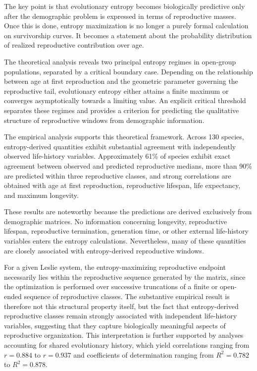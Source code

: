 \documentclass[10pt,a4paper]{amsart}
\theoremstyle{definition}
\theoremstyle{remark}
\numberwithin{equation}{section}
\begin{document}
The key point is that evolutionary entropy becomes biologically predictive only after the demographic problem is expressed in terms of reproductive masses. Once this is done, entropy maximization is no longer a purely formal calculation on survivorship curves. It becomes a statement about the probability distribution of realized reproductive contribution over age.

The theoretical analysis reveals two principal entropy regimes in
open-group populations, separated by a critical boundary case. Depending on the relationship between age at first
reproduction and the geometric parameter governing the reproductive
tail, evolutionary entropy either attains a finite maximum or
converges asymptotically towards a limiting value. An explicit
critical threshold separates these regimes and provides a criterion
for predicting the qualitative structure of reproductive windows
from demographic information.

The empirical analysis supports this theoretical framework. Across
130 species, entropy-derived quantities exhibit substantial agreement
with independently observed life-history variables. Approximately
61\% of species exhibit exact agreement between observed and predicted
reproductive medians, more than 90\% are predicted within three
reproductive classes, and strong correlations are obtained with age
at first reproduction, reproductive lifespan, life expectancy, and
maximum longevity.

These results are noteworthy because the predictions are derived
exclusively from demographic matrices. No information concerning
longevity, reproductive lifespan, reproductive termination,
generation time, or other external life-history variables enters the
entropy calculations. Nevertheless, many of these quantities are
closely associated with entropy-derived reproductive windows.

For a given Leslie system, the entropy-maximizing reproductive endpoint
necessarily lies within the reproductive sequence generated by the matrix,
since the optimization is performed over successive truncations of a finite
or open-ended sequence of reproductive classes. The substantive empirical result is therefore not this structural property itself, but the fact that entropy-derived reproductive classes remain strongly associated with independent life-history variables, suggesting that they capture biologically meaningful aspects of reproductive organization. This interpretation is further supported by analyses accounting for shared evolutionary history, which yield correlations ranging from $r=0.884$ to $r=0.937$ and coefficients of determination ranging from $R^2=0.782$ to $R^2=0.878$.
\end{document}
